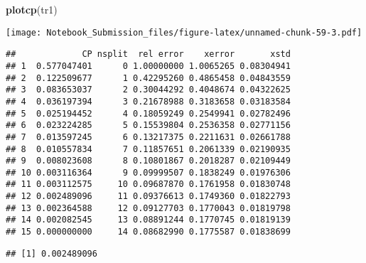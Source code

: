 \documentclass[
]{article}
\newenvironment{Shaded}{\begin{snugshade}}{\end{snugshade}}
\newcommand{\DataTypeTok}[1]{\textcolor[rgb]{0.13,0.29,0.53}{#1}}
\newcommand{\DecValTok}[1]{\textcolor[rgb]{0.00,0.00,0.81}{#1}}
\newcommand{\KeywordTok}[1]{\textcolor[rgb]{0.13,0.29,0.53}{\textbf{#1}}}
\newcommand{\NormalTok}[1]{#1}
\newcommand{\OperatorTok}[1]{\textcolor[rgb]{0.81,0.36,0.00}{\textbf{#1}}}
\newcommand{\StringTok}[1]{\textcolor[rgb]{0.31,0.60,0.02}{#1}}
\begin{document}
\begin{Shaded}
\begin{Highlighting}[]
\KeywordTok{plotcp}\NormalTok{(tr1)}
\end{Highlighting}
\end{Shaded}

\texttt{[image: Notebook\_Submission\_files/figure-latex/unnamed-chunk-59-3.pdf]}

\begin{Shaded}
\end{Shaded}

\begin{verbatim}
##             CP nsplit  rel error    xerror       xstd
## 1  0.577047401      0 1.00000000 1.0065265 0.08304941
## 2  0.122509677      1 0.42295260 0.4865458 0.04843559
## 3  0.083653037      2 0.30044292 0.4048674 0.04322625
## 4  0.036197394      3 0.21678988 0.3183658 0.03183584
## 5  0.025194452      4 0.18059249 0.2549941 0.02782496
## 6  0.023224285      5 0.15539804 0.2536358 0.02771156
## 7  0.013597245      6 0.13217375 0.2211631 0.02661788
## 8  0.010557834      7 0.11857651 0.2061339 0.02190935
## 9  0.008023608      8 0.10801867 0.2018287 0.02109449
## 10 0.003116364      9 0.09999507 0.1838249 0.01976306
## 11 0.003112575     10 0.09687870 0.1761958 0.01830748
## 12 0.002489096     11 0.09376613 0.1749360 0.01822793
## 13 0.002364588     12 0.09127703 0.1770043 0.01819798
## 14 0.002082545     13 0.08891244 0.1770745 0.01819139
## 15 0.000000000     14 0.08682990 0.1775587 0.01838699
\end{verbatim}

\begin{Shaded}
\end{Shaded}

\begin{verbatim}
## [1] 0.002489096
\end{verbatim}

\begin{Shaded}
\end{Shaded}
\end{document}
